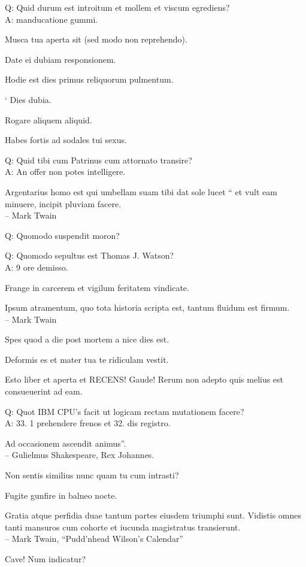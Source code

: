 \documentclass[titlepage,12pt]{memoir}
\begin{document}
Q: Quid durum est introitum et mollem et viscum egrediens?\\
A: manducatione gummi.

 Musca tua aperta sit (sed modo non reprehendo).

Date ei dubiam responsionem.

Hodie est dies primus reliquorum pulmentum.

‘ Dies dubia.

Rogare aliquem aliquid.

Habes fortis ad sodales tui sexus.

Q: Quid tibi cum Patrinus cum attornato transire?\\
A: An offer non potes intelligere.

 Argentarius homo est qui umbellam suam tibi dat sole lucet “
et vult eam minuere, incipit pluviam facere.
\\-- Mark Twain

Q: Quomodo suspendit moron?

Q: Quomodo sepultus est Thomas J. Watson?\\
A: 9 ore demisso.

Frange in carcerem et vigilum feritatem vindicate.

Ipsum atramentum, quo tota historia scripta est, tantum fluidum est firmum.
\\-- Mark Twain

Spes quod a die post mortem a nice dies est.

Deformis es et mater tua te ridiculam vestit.

Esto liber et aperta et RECENS! Gaude! Rerum non adepto quis melius est
consueuerint ad eam.

Q: Quot IBM CPU’s facit ut logicam rectam mutationem facere?\\
A: 33. 1 prehendere frenos et 32. dis registro.

Ad occasionem ascendit animus”.
\\-- Gulielmus Shakespeare, Rex Johannes.

Non sentis similius nunc quam tu cum intrasti?

Fugite gunfire in balneo nocte.

 Gratia atque perfidia duae tantum partes eiusdem triumphi sunt.
Vidistis omnes tanti mansuros cum cohorte et iucunda
magistratus transierunt.
\\-- Mark Twain, “Pudd’nhead Wilson’s Calendar”

Cave! Num indicatur?
\end{document}
